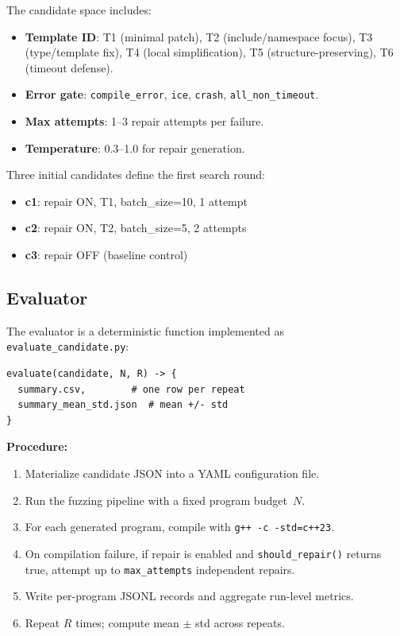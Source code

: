\documentclass[conference]{IEEEtran}
\begin{document}
\noindent The candidate space includes:
\begin{itemize}
    \item \textbf{Template ID}: T1 (minimal patch), T2 (include/namespace focus), T3 (type/template fix), T4 (local simplification), T5 (structure-preserving), T6 (timeout defense).
    \item \textbf{Error gate}: \texttt{compile\_error}, \texttt{ice}, \texttt{crash}, \texttt{all\_non\_timeout}.
    \item \textbf{Max attempts}: 1--3 repair attempts per failure.
    \item \textbf{Temperature}: 0.3--1.0 for repair generation.
\end{itemize}

Three initial candidates define the first search round:
\begin{itemize}
    \item \textbf{c1}: repair ON, T1, batch\_size=10, 1 attempt
    \item \textbf{c2}: repair ON, T2, batch\_size=5, 2 attempts
    \item \textbf{c3}: repair OFF (baseline control)
\end{itemize}

\subsection{Evaluator}

The evaluator is a deterministic function implemented as \texttt{evaluate\_candidate.py}:

\begin{lstlisting}
evaluate(candidate, N, R) -> {
  summary.csv,        # one row per repeat
  summary_mean_std.json  # mean +/- std
}
\end{lstlisting}

\noindent\textbf{Procedure:}
\begin{enumerate}
    \item Materialize candidate JSON into a YAML configuration file.
    \item Run the fuzzing pipeline with a fixed program budget~$N$.
    \item For each generated program, compile with \texttt{g++ -c -std=c++23}.
    \item On compilation failure, if repair is enabled and \texttt{should\_repair()} returns true, attempt up to \texttt{max\_attempts} independent repairs.
    \item Write per-program JSONL records and aggregate run-level metrics.
    \item Repeat $R$ times; compute mean $\pm$ std across repeats.
\end{enumerate}
\end{document}
